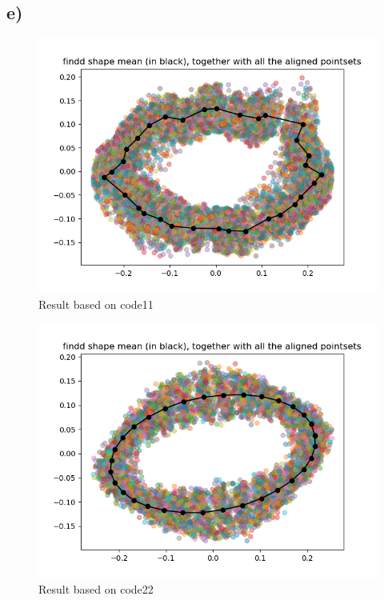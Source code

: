 \documentclass{article}
\begin{document}
\newpage
\thispagestyle{fancy}
\subsection{e)}
\begin{figure}[H]
    \centerline{\includegraphics[scale=0.5]{../results/ellipses/mean-and-aligned-data.png}}
    \caption{Result based on code11}
\end{figure}

\begin{figure}[H]
    \centerline{\includegraphics[scale=0.5]{../results/ellipses/mean-and-aligned-data2.png}}
    \caption{Result based on code22}
\end{figure}
\end{document}
